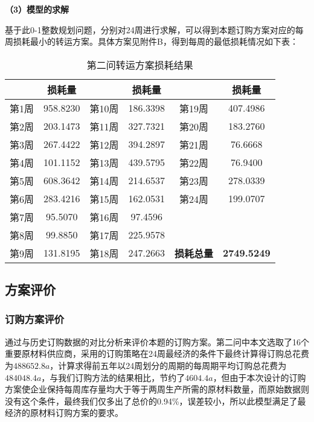 \documentclass[withoutpreface,bwprint]{cumcmthesis} %
\begin{document}
\noindent\textbf{（3）模型的求解}

基于此0-1整数规划问题，分别对24周进行求解，可以得到本题订购方案对应的每周损耗最小的转运方案。具体方案见附件B，得到每周的最低损耗情况如下表：

\begin{table}[h]
    \caption{第二问转运方案损耗结果}\label{tab005} \centering
    \centering
    \begin{tabular}{|c|c|c|c|c|c|}
    \hline
    & \textbf{损耗量} &  & \textbf{损耗量} &  & \textbf{损耗量} \\ \hline
        第1周 & 958.8230 & 第10周 & 186.3398 & 第19周 & 407.4986 \\ \hline
        第2周 & 203.1473 & 第11周 & 327.7321 & 第20周 & 183.2760 \\ \hline
        第3周 & 267.4422 & 第12周 & 394.2897 & 第21周 & 76.6668 \\ \hline
        第4周 & 101.1152 & 第13周 & 439.5795 & 第22周 & 76.9400 \\ \hline
        第5周 & 608.3642 & 第14周 & 214.6537 & 第23周 & 278.0339 \\ \hline
        第6周 & 283.4216 & 第15周 & 162.0531 & 第24周 & 199.0707 \\ \hline
        第7周 & 95.5070 & 第16周 & 97.4596 &  &  \\ \hline
        第8周 & 99.8850 & 第17周 & 225.9578 &  &  \\ \hline
        第9周 & 131.8195 & 第18周 & 247.2663 & \textbf{损耗总量} & \textbf{2749.5249} \\ \hline
    \end{tabular}
\end{table}

\subsection{方案评价}
\subsubsection{订购方案评价}

通过与历史订购数据的对比分析来评价本题的订购方案。第二问中本文选取了16个重要原材料供应商，采用的订购策略在24周最经济的条件下最终计算得订购总花费为$488652.8a$，计算求得前五年以24周划分的周期的每周期平均订购总花费为$484048.4a$，与我们订购方法的结果相比，节约了$4604.4a$，但由于本次设计的订购方案使企业保持每周库存量均大于等于两周生产所需的原材料数量，而原始数据则没有这个条件，最终我们仅多出了总价的0.94\%，误差较小，所以此模型满足了最经济的原材料订购方案的要求。
\end{document}

